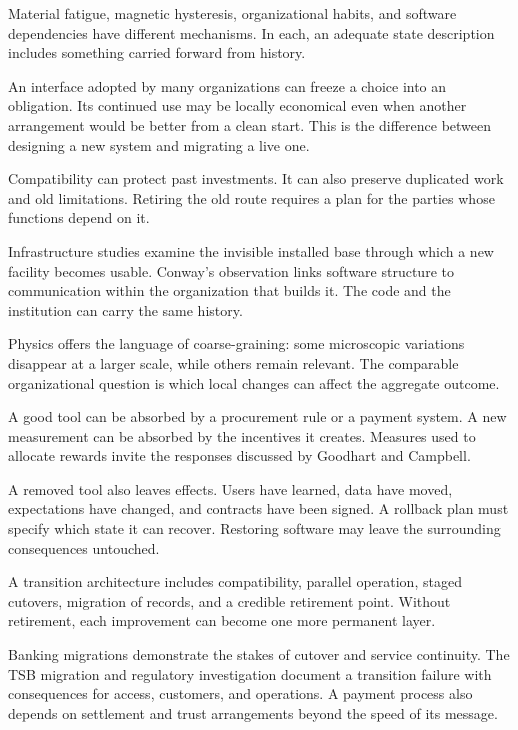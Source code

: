 Material fatigue, magnetic hysteresis, organizational habits, and software dependencies have different mechanisms. In each, an adequate state description includes something carried forward from history.


An interface adopted by many organizations can freeze a choice into an obligation. Its continued use may be locally economical even when another arrangement would be better from a clean start. This is the difference between designing a new system and migrating a live one.

Compatibility can protect past investments. It can also preserve duplicated work and old limitations. Retiring the old route requires a plan for the parties whose functions depend on it.

Infrastructure studies examine the invisible installed base through which a new facility becomes usable.\cite{star1999layers} Conway's observation links software structure to communication within the organization that builds it.\cite{conway1968how} The code and the institution can carry the same history.


Physics offers the language of coarse-graining: some microscopic variations disappear at a larger scale, while others remain relevant.\cite{wilson1971renormalization} The comparable organizational question is which local changes can affect the aggregate outcome.

A good tool can be absorbed by a procurement rule or a payment system. A new measurement can be absorbed by the incentives it creates. Measures used to allocate rewards invite the responses discussed by Goodhart and Campbell.\cite{goodhart1975problems,campbell1979assessing}

A removed tool also leaves effects. Users have learned, data have moved, expectations have changed, and contracts have been signed. A rollback plan must specify which state it can recover. Restoring software may leave the surrounding consequences untouched.


A transition architecture includes compatibility, parallel operation, staged cutovers, migration of records, and a credible retirement point. Without retirement, each improvement can become one more permanent layer.

Banking migrations demonstrate the stakes of cutover and service continuity. The TSB migration and regulatory investigation document a transition failure with consequences for access, customers, and operations.\cite{tsb2019migration} A payment process also depends on settlement and trust arrangements beyond the speed of its message.\cite{kahn2009why}


